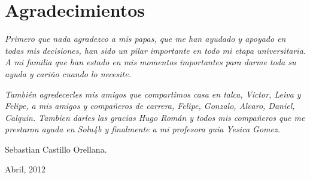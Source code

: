 \thispagestyle{empty}
\section*{Agradecimientos}
\emph{Primero que nada agradezco a mis papas, que me han ayudado y apoyado en todas mis decisiones, han sido un pilar importante en todo mi etapa universitaria. A mi familia que han estado en mis momentos importantes para darme toda su ayuda y cariño cuando lo necesite.}
\newline
\par 
\textit{También agredecerles mis amigos que compartimos casa en talca, Victor, Leiva y Felipe, a mis amigos y compañeros de carrera, Felipe, Gonzalo, Alvaro, Daniel, Calquin. Tambien darles las gracias Hugo Román y todos mis compañeros que me prestaron ayuda en Solu4b y finalmente a mi profesora guia Yesica Gomez.}
\newline

\hfill Sebastian Castillo Orellana.

\hfill Abril, 2012



